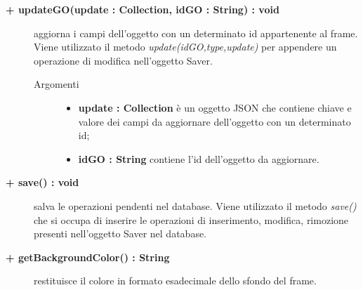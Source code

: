 \begin{description}
\begin{description}
\begin{description}
\begin{description}
\end{description}

\end{description}

\begin{description}
		\item[\textbf{\color{blue}+ updateGO(update : Collection, idGO : String) : void			}] \hfill
			aggiorna i campi dell'oggetto con un determinato id appartenente al frame. Viene utilizzato il metodo \textit{update(idGO,type,update)} per appendere un operazione di modifica nell'oggetto Saver. 

\begin{description}
			\item[Argomenti] \hfill
				\begin{itemize}
						\item \textbf{update : Collection			} \hfill
					è un oggetto JSON che contiene chiave e valore dei campi da aggiornare dell'oggetto con un determinato id;
					\item \textbf{idGO : String			} \hfill
					contiene l'id dell'oggetto da aggiornare.
				\end{itemize}

\end{description}

\end{description}

\begin{description}
		\item[\textbf{\color{blue}+ save() : void			}] \hfill
			salva le operazioni pendenti nel database. Viene utilizzato il metodo \textit{save()} che si occupa di inserire le operazioni di inserimento, modifica, rimozione presenti nell'oggetto Saver nel database. 

\end{description}

\begin{description} 
		\item[\textbf{\color{blue}+ getBackgroundColor() : String			}] \hfill
			restituisce il colore in formato esadecimale dello sfondo del frame.     

\end{description}



\end{description}

\end{description}


